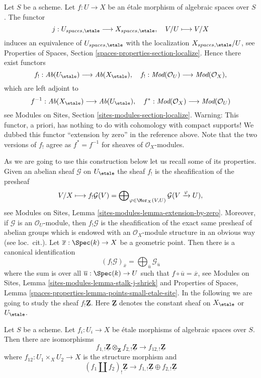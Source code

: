 \noindent
Let $S$ be a scheme. Let $f : U \to X$ be an \'etale morphism of algebraic
spaces over $S$. The functor
$$
j : U_{spaces, \etale} \longrightarrow X_{spaces, \etale},\quad
V/U \longmapsto V/X
$$
induces an equivalence of $U_{spaces, \etale}$ with the localization
$X_{spaces, \etale}/U$, see
Properties of Spaces, Section \ref{spaces-properties-section-localize}.
Hence there exist functors
$$
f_! : \textit{Ab}(U_\etale) \longrightarrow
\textit{Ab}(X_\etale),\quad
f_! : \textit{Mod}(\mathcal{O}_U) \longrightarrow \textit{Mod}(\mathcal{O}_X),
$$
which are left adjoint to
$$
f^{-1} : \textit{Ab}(X_\etale) \longrightarrow
\textit{Ab}(U_\etale),\quad
f^* : \textit{Mod}(\mathcal{O}_X) \longrightarrow \textit{Mod}(\mathcal{O}_U)
$$
see
Modules on Sites, Section \ref{sites-modules-section-localize}.
Warning: This functor, a priori, has
nothing to do with cohomology with compact supports!
We dubbed this functor ``extension by zero'' in the reference above.
Note that the two versions of $f_!$ agree as $f^* = f^{-1}$ for
sheaves of $\mathcal{O}_X$-modules.

\medskip\noindent
As we are going to use this construction below let us recall some of its
properties. Given an abelian sheaf $\mathcal{G}$ on $U_\etale$
the sheaf $f_!$ is the sheafification of the presheaf
$$
V/X \longmapsto
f_!\mathcal{G}(V) =
\bigoplus\nolimits_{\varphi \in \Mor_X(V, U)}
\mathcal{G}(V \xrightarrow{\varphi} U),
$$
see
Modules on Sites, Lemma \ref{sites-modules-lemma-extension-by-zero}.
Moreover, if $\mathcal{G}$ is an $\mathcal{O}_U$-module, then $f_!\mathcal{G}$
is the sheafification of the exact same presheaf of abelian groups which
is endowed with an $\mathcal{O}_X$-module structure in an obvious way
(see loc.\ cit.). Let $\overline{x} : \Spec(k) \to X$
be a geometric point. Then there is a canonical identification
$$
(f_!\mathcal{G})_{\overline{x}} =
\bigoplus\nolimits_{\overline{u}} \mathcal{G}_{\overline{u}}
$$
where the sum is over all $\overline{u} : \Spec(k) \to U$ such that
$f \circ \overline{u} = \overline{x}$, see
Modules on Sites, Lemma \ref{sites-modules-lemma-stalk-j-shriek}
and
Properties of Spaces, Lemma
\ref{spaces-properties-lemma-points-small-etale-site}.
In the following we are going to study the sheaf $f_!\underline{\mathbf{Z}}$.
Here $\underline{\mathbf{Z}}$ denotes the constant sheaf on
$X_\etale$ or $U_\etale$.

\begin{lemma}
\label{lemma-product-is-tensor-product}
Let $S$ be a scheme. Let $f_i : U_i \to X$ be \'etale morphisms
of algebraic spaces over $S$. Then there are isomorphisms
$$
f_{1, !}\underline{\mathbf{Z}} \otimes_{\mathbf{Z}}
f_{2, !}\underline{\mathbf{Z}}
\longrightarrow
f_{12, !}\underline{\mathbf{Z}}
$$
where $f_{12} : U_1 \times_X U_2 \to X$ is the structure morphism
and
$$
(f_1 \amalg f_2)_! \underline{\mathbf{Z}}
\longrightarrow
f_{1, !}\underline{\mathbf{Z}} \oplus
f_{2, !}\underline{\mathbf{Z}}
$$
\end{lemma}

